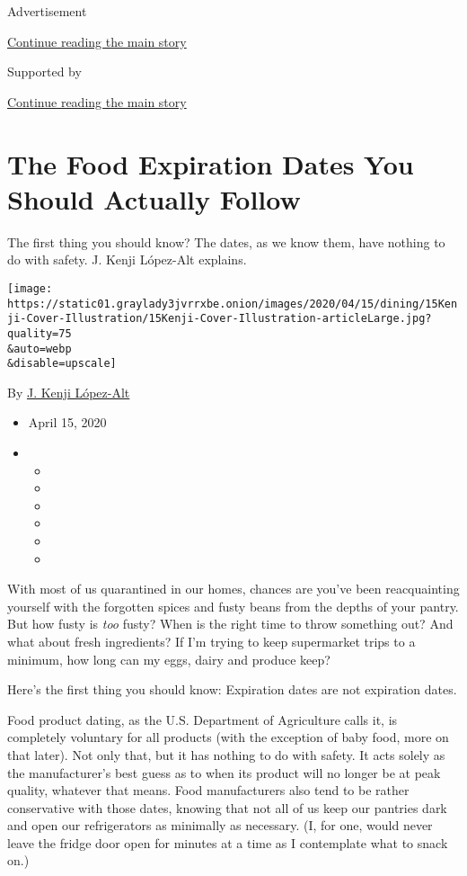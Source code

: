 Advertisement

\protect\hyperlink{after-top}{Continue reading the main story}

Supported by

\protect\hyperlink{after-sponsor}{Continue reading the main story}

\hypertarget{the-food-expiration-dates-you-should-actually-follow}{%
\section{The Food Expiration Dates You Should Actually
Follow}\label{the-food-expiration-dates-you-should-actually-follow}}

The first thing you should know? The dates, as we know them, have
nothing to do with safety. J. Kenji López-Alt explains.

\texttt{[image: https://static01.graylady3jvrrxbe.onion/images/2020/04/15/dining/15Kenji-Cover-Illustration/15Kenji-Cover-Illustration-articleLarge.jpg?quality=75\\\&auto=webp\\\&disable=upscale]}

By \href{https://www.nytimes3xbfgragh.onion/by/j-kenji-lopez-alt}{J.
Kenji López-Alt}

\begin{itemize}
\item
  April 15, 2020
\item
  \begin{itemize}
  \item
  \item
  \item
  \item
  \item
  \item
  \end{itemize}
\end{itemize}

With most of us quarantined in our homes, chances are you've been
reacquainting yourself with the forgotten spices and fusty beans from
the depths of your pantry. But how fusty is \emph{too} fusty? When is
the right time to throw something out? And what about fresh ingredients?
If I'm trying to keep supermarket trips to a minimum, how long can my
eggs, dairy and produce keep?

Here's the first thing you should know: Expiration dates are not
expiration dates.

Food product dating, as the U.S. Department of Agriculture calls it, is
completely voluntary for all products (with the exception of baby food,
more on that later). Not only that, but it has nothing to do with
safety. It acts solely as the manufacturer's best guess as to when its
product will no longer be at peak quality, whatever that means. Food
manufacturers also tend to be rather conservative with those dates,
knowing that not all of us keep our pantries dark and open our
refrigerators as minimally as necessary. (I, for one, would never leave
the fridge door open for minutes at a time as I contemplate what to
snack on.)

